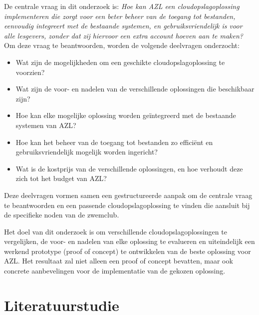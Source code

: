 De centrale vraag in dit onderzoek is: \textit{Hoe kan AZL een cloudopslagoplossing implementeren die zorgt voor een beter beheer van de 
toegang tot bestanden, eenvoudig integreert met de bestaande systemen, en gebruiksvriendelijk is voor alle lesgevers, zonder dat zij hiervoor 
een extra account hoeven aan te maken?} Om deze vraag te beantwoorden, worden de volgende deelvragen onderzocht:
\begin{itemize}
    \item Wat zijn de mogelijkheden om een geschikte cloudopslagoplossing te voorzien?
    \item Wat zijn de voor- en nadelen van de verschillende oplossingen die beschikbaar zijn?
    \item Hoe kan elke mogelijke oplossing worden geïntegreerd met de bestaande systemen van AZL?
    \item Hoe kan het beheer van de toegang tot bestanden zo efficiënt en gebruiksvriendelijk mogelijk worden ingericht?
    \item Wat is de kostprijs van de verschillende oplossingen, en hoe verhoudt deze zich tot het budget van AZL?
\end{itemize}
Deze deelvragen vormen samen een gestructureerde aanpak om de centrale vraag te beantwoorden en een passende cloudopslagoplossing 
te vinden die aansluit bij de specifieke noden van de zwemclub.

Het doel van dit onderzoek is om verschillende cloudopslagoplossingen te vergelijken, de voor- en nadelen van elke oplossing te evalueren en uiteindelijk een werkend prototype (proof of concept) te ontwikkelen van de beste oplossing voor AZL. Het resultaat zal niet alleen een proof of concept bevatten, maar ook concrete aanbevelingen voor de implementatie van de gekozen oplossing.


\section{Literatuurstudie}%
\label{sec:literatuurstudie}

